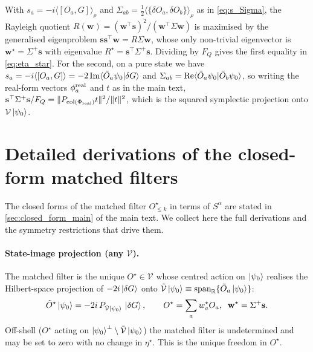 \documentclass[11pt,a4paper]{article}
\newcommand{\FQ}{F_Q}
\newcommand{\PsiZ}{\ket{\psi_0}}
\newcommand{\dG}{\ket{\delta G}}
\providecommand{\anticomm}[2]{\{#1,#2\}}\renewcommand{\anticomm}[2]{\{#1,#2\}}
\begin{document}
With $s_a=-i\langle[O_a,G]\rangle_\rho$ and $\Sigma_{ab}=
\frac12\langle\anticomm{\delta O_a}{\delta O_b}\rangle_\rho$ as in
\eqref{eq:s_Sigma}, the Rayleigh quotient
$R(\mathbf w)=(\mathbf w^\top\mathbf s)^2/(\mathbf w^\top\Sigma\mathbf w)$
is maximised by the generalised eigenproblem
$\mathbf s\mathbf s^\top\mathbf w=R\Sigma\mathbf w$, whose only
non-trivial eigenvector is $\mathbf w^\star=\Sigma^+\mathbf s$ with
eigenvalue $R^\star=\mathbf s^\top\Sigma^+\mathbf s$.  Dividing by
$\FQ$ gives the first equality in \eqref{eq:eta_star}.  For the
second, on a pure state we have $s_a=-i\langle[O_a,G]\rangle=
-2\,{\rm Im}\langle\tilde O_a\psi_0|\delta G\rangle$ and
$\Sigma_{ab}={\rm Re}\langle\tilde O_a\psi_0|\tilde O_b\psi_0\rangle$,
so writing the real-form vectors $\phi_a^{\rm real}$ and
$t$ as in the main text,
$\mathbf s^\top\Sigma^+\mathbf s/\FQ
=\Vert P_{\mathrm{col}(\Phi_{\rm real})}t\Vert^2/\Vert t\Vert^2$,
which is the squared symplectic projection onto $\mathcal V\PsiZ$.

\section{Detailed derivations of the closed-form matched filters}
\label{app:closedform}

The closed forms of the matched filter $O^\star_{\le k}$ in terms
of $S^\alpha$ are stated in \cref{sec:closed_form_main} of the
main text.  We collect here the full derivations and the
symmetry restrictions that drive them.

\paragraph{State-image projection (any $\mathcal V$).}
The matched filter is the unique $O^\star\in\mathcal V$ whose
centred action on $\PsiZ$ realises the Hilbert-space projection of
$-2i\dG$ onto
$\tilde{\mathcal V}\PsiZ\equiv\mathrm{span}_{\mathbb R}\{\tilde O_a\PsiZ\}$:
\begin{equation}
   \tilde O^\star\PsiZ=-2i\,P_{\tilde{\mathcal V}\PsiZ}\,\dG,\qquad
   O^\star=\sum_a w^\star_a O_a,\;\;\mathbf w^\star=\Sigma^+\mathbf s.
   \label{eq:Ostar_projection}
\end{equation}
Off-shell ($O^\star$ acting on $\PsiZ^\perp\setminus\tilde{\mathcal V}\PsiZ$)
the matched filter is undetermined and may be set to zero with no
change in $\eta^\star$.  This is the unique freedom in $O^\star$.
\end{document}
